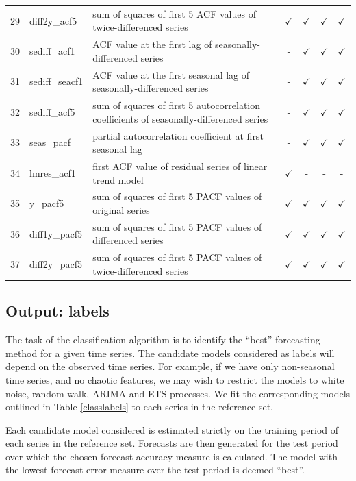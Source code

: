 \documentclass[11pt,a4paper,]{article}
\def\yes{$\checkmark$}
\begin{document}
\begin{table}[!htp]
\begin{tabular}{llp{}cccc}
29 & diff2y\_acf5   & sum of squares of first 5 ACF values of twice-differenced series                        & \yes  & \yes & \yes & \yes \\
30 & sediff\_acf1 & ACF value at the first lag of seasonally-differenced series                               & -     & \yes & \yes & \yes\\
31 & sediff\_seacf1 & ACF value at the first seasonal lag of seasonally-differenced series                    & -     & \yes & \yes & \yes\\
32 & sediff\_acf5   & sum of squares of first 5 autocorrelation coefficients of seasonally-differenced series & -     & \yes & \yes & \yes\\
33 & seas\_pacf     & partial autocorrelation coefficient at first seasonal lag & -     & \yes & \yes & \yes\\
34 & lmres\_acf1    & first ACF value of residual series of linear trend model                                & \yes  & - & - & -\\
35 & y\_pacf5       & sum of squares of first 5 PACF values of original series                                & \yes  & \yes & \yes & \yes\\
36 & diff1y\_pacf5  & sum of squares of first 5 PACF values of differenced series                             & \yes  & \yes & \yes & \yes\\
37 & diff2y\_pacf5  & sum of squares of first 5 PACF values of twice-differenced series                       & \yes  & \yes & \yes & \yes\\
\bottomrule
\end{tabular}
\end{table}

\hypertarget{output-labels}{%
\subsection{Output: labels}\label{output-labels}}

The task of the classification algorithm is to identify the ``best'' forecasting method for a given time series. The candidate models considered as labels will depend on the observed time series. For example, if we have only non-seasonal time series, and no chaotic features, we may wish to restrict the models to white noise, random walk, ARIMA and ETS processes. We fit the corresponding models outlined in Table \ref{classlabels} to each series in the reference set.

Each candidate model considered is estimated strictly on the training period of each series in the reference set. Forecasts are then generated for the test period over which the chosen forecast accuracy measure is calculated. The model with the lowest forecast error measure over the test period is deemed ``best''.
\end{document}
